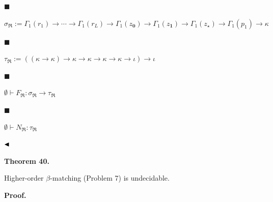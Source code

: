 \documentclass[10pt,a4paper]{amsart}
\begin{document}
 
 
\par\noindent  $\blacksquare$ 
 
$\sigma_{\mathfrak{R}}:=\Gamma_{1}(r_{1})\to\cdots\to\Gamma_{1}(r_{L})\to\Gamma%
_{1}(z_{\mathbf{0}})\to\Gamma_{1}(z_{\mathbf{1}})\to\Gamma_{1}(z_{\star})\to%
\Gamma_{1}(p_{1})\to\kappa$\par
 
 
 
\par\noindent  $\blacksquare$ 
 
$\tau_{\mathfrak{R}}:=((\kappa\to\kappa)\to\kappa\to\kappa\to\kappa\to\kappa\to%
\iota)\to\iota$\par
 
 
 
\par\noindent  $\blacksquare$ 
 
$\emptyset\vdash F_{\mathfrak{R}}:\sigma_{\mathfrak{R}}\to\tau_{\mathfrak{R}}$\par
 
 
 
\par\noindent  $\blacksquare$ 
 
$\emptyset\vdash N_{\mathfrak{R}}:\tau_{\mathfrak{R}}$\par
 
 
  
$\hfill\blacktriangleleft$\par
 
 
 
\par\medskip\noindent\textbf{Theorem 40.}\par
 
 
Higher-order $\beta$-matching (Problem 7) is undecidable.\par
 
 
 
 
 
\par\medskip\noindent\textbf{Proof.}\par
 
\end{document}
